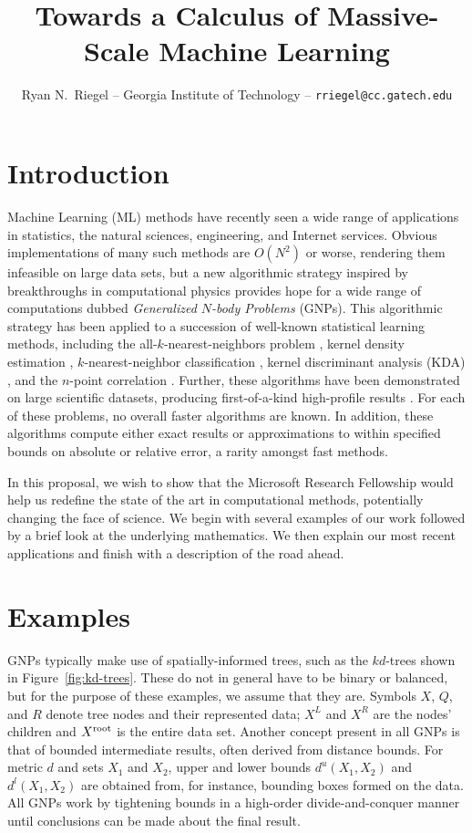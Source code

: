 \documentclass[twoside,leqno,twocolumn]{article}
\title{Towards a Calculus of Massive-Scale Machine Learning}
\author{Ryan N.~Riegel --
    Georgia Institute of Technology --
    \texttt{rriegel@cc.gatech.edu}
}
\date{}
\newcommand{\kdroot}[1]{#1^{\rm root}}
\newcommand{\kdleft}[1]{#1^{\!L}}
\newcommand{\kdright}[1]{#1^{\!R}}
\newcommand{\lo}[1]{#1^{l}}
\newcommand{\hi}[1]{#1^{u}}
\begin{document}
\maketitle

\section{Introduction}
Machine Learning (ML) methods have recently seen a wide range of
applications in statistics, the natural sciences, engineering, and
Internet services.  Obvious implementations of many such methods are
$O(N^2)$ or worse, rendering them infeasible on large data sets, but a
new algorithmic strategy \cite{nips2000paper} inspired by
breakthroughs in computational physics \cite{appel2, barnes_hut,
grngard} provides hope for a wide range of computations dubbed {\em
Generalized $N$-body Problems} (GNPs).  This algorithmic strategy has
been applied to a succession of well-known statistical learning
methods, including the all-$k$-nearest-neighbors problem
\cite{nips2000paper}, kernel density estimation \cite{nips2000paper,
kde-siamdm, kde-nips-dong, kde-uai-dong}, $k$-nearest-neighbor
classification \cite{ting-liu}, kernel discriminant analysis (KDA)
\cite{nbc-compstat}, and the $n$-point correlation
\cite{nips2000paper, moore-npt}.  Further, these algorithms have been
demonstrated on large scientific datasets, producing first-of-a-kind
high-profile results \cite{science03, nature05}.  For each of these
problems, no overall faster algorithms are known.  In addition, these
algorithms compute either exact results or approximations to within
specified bounds on absolute or relative error, a rarity amongst fast
methods.

In this proposal, we wish to show that the Microsoft Research
Fellowship would help us redefine the state of the art in
computational methods, potentially changing the face of science.  We
begin with several examples of our work followed by a brief look at
the underlying mathematics.  We then explain our most recent
applications and finish with a description of the road ahead.

\section{Examples}
GNPs typically make use of spatially-informed trees, such as the
$kd$-trees \cite{preparata} shown in Figure~\ref{fig:kd-trees}.  These
do not in general have to be binary or balanced, but for the purpose
of these examples, we assume that they are.  Symbols $X$, $Q$, and $R$
denote tree nodes and their represented data; $\kdleft{X}$ and
$\kdright{X}$ are the nodes' children and $\kdroot{X}$ is the entire
data set.  Another concept present in all GNPs is that of bounded
intermediate results, often derived from distance bounds.  For metric
$d$ and sets $X_1$ and $X_2$, upper and lower bounds $\hi{d}(X_1,X_2)$
and $\lo{d}(X_1,X_2)$ are obtained from, for instance, bounding boxes
formed on the data.  All GNPs work by tightening bounds in a
high-order divide-and-conquer manner until conclusions can be made
about the final result.
\end{document}

